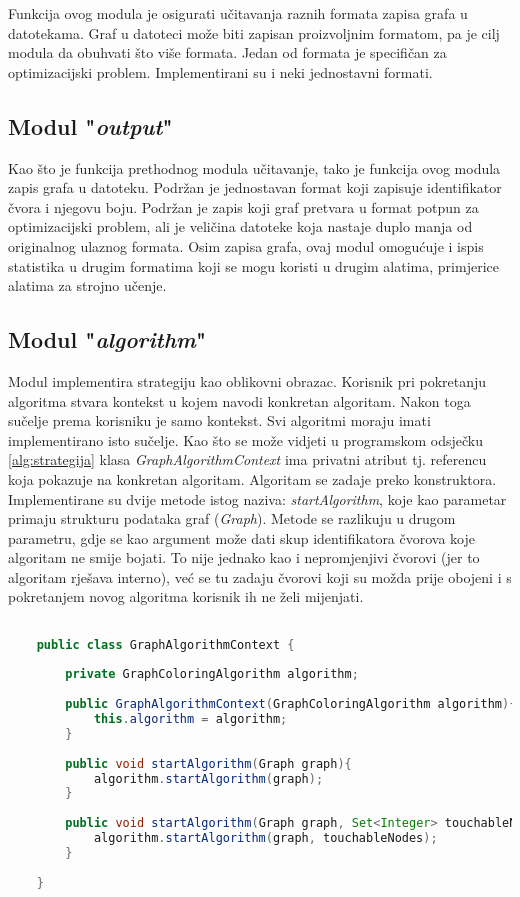 \documentclass[times, utf8, diplomski, numeric]{fer}
\begin{document}
Funkcija ovog modula je osigurati učitavanja raznih formata zapisa grafa u datotekama. Graf u datoteci može biti zapisan proizvoljnim formatom, pa je cilj modula da obuhvati što više formata. Jedan od formata je specifičan za optimizacijski problem. Implementirani su i neki jednostavni formati. 

\subsection{Modul "\emph{output}"}

Kao što je funkcija prethodnog modula učitavanje, tako je funkcija ovog modula zapis grafa u datoteku. Podržan je jednostavan format koji zapisuje identifikator čvora i njegovu boju. Podržan je zapis koji graf pretvara u format potpun za optimizacijski problem, ali je veličina datoteke koja nastaje duplo manja od originalnog ulaznog formata. Osim zapisa grafa, ovaj modul omogućuje i ispis statistika u drugim formatima koji se mogu koristi u drugim alatima, primjerice alatima za strojno učenje.

\subsection{Modul "\emph{algorithm}"}

Modul implementira strategiju kao oblikovni obrazac. Korisnik pri pokretanju algoritma stvara kontekst u kojem navodi konkretan algoritam. Nakon toga sučelje prema korisniku je samo kontekst. Svi algoritmi moraju imati implementirano isto sučelje. Kao što se može vidjeti u programskom odsječku \ref{alg:strategija} klasa \emph{GraphAlgorithmContext} ima privatni atribut tj. referencu koja pokazuje na konkretan algoritam. Algoritam se zadaje preko konstruktora. Implementirane su dvije metode istog naziva: \emph{startAlgorithm}, koje kao parametar primaju strukturu podataka graf (\emph{Graph}). Metode se razlikuju u drugom parametru, gdje se kao argument može dati skup identifikatora čvorova koje algoritam ne smije bojati. To nije jednako kao i nepromjenjivi čvorovi (jer to algoritam rješava interno), već se tu zadaju čvorovi koji su možda prije obojeni i s pokretanjem novog algoritma korisnik ih ne želi mijenjati. 

\begin{singlespace}
	\begin{lstlisting}[label=alg:strategija, language=Java, caption=Definicija klase i metoda za oblikovni obrazac strategija]

	public class GraphAlgorithmContext {
	
		private GraphColoringAlgorithm algorithm;
	
		public GraphAlgorithmContext(GraphColoringAlgorithm algorithm){
			this.algorithm = algorithm;
		}
	
		public void startAlgorithm(Graph graph){
			algorithm.startAlgorithm(graph);
		}
	
		public void startAlgorithm(Graph graph, Set<Integer> touchableNodes){
			algorithm.startAlgorithm(graph, touchableNodes);
		}
	
	}

	\end{lstlisting}
\end{singlespace}
\end{document}

